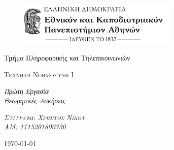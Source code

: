 \documentclass[12pt]{article}
\newcommand{\thedate}{\today}
\theoremstyle{definition}
\begin{document}
\begin{titlepage}
\begin{center}

\begin{figure}[h!]
    \centering\includegraphics[width=0.7\textwidth]{images/nkualogo.png}
\end{figure}

\textnormal{ \LARGE{Τμήμα Πληροφορικής και Τηλεπικοινωνιών\\ }}
\end{center}
\vspace{25mm}

\begin{center}
\textsc{\LARGE Τεχνητή Νοημοσύνη Ι\\}
\end{center}


\vspace{8mm}
\begin{center}
	\fontsize{8mm}{5mm}\selectfont 
	
    \textup{\emph{Πρώτη Εργασία}}\\
    
    \textup{\emph{Θεωρητικές Ασκήσεις}}\\

	\vspace{5mm}

\end{center}
\vspace{8mm}

\vfill

\noindent \textsc{\Large \emph{Συγγραφή: Χρήστος Νίκου}}\\
\textsc{\Large \emph{ΑΜ: 1115201800330}}\\
\vspace{3mm}


\vspace{2mm}

\begin{center}
\vspace{2cm}

\LARGE {\thedate}    
\end{center}

\end{titlepage}
\end{document}
